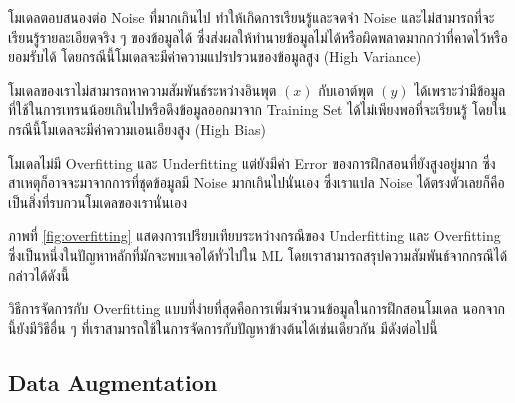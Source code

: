 \begin{description}[style=nextline]
    \item[Overfitting] โมเดลตอบสนองต่อ Noise ที่มากเกินไป ทำให้เกิดการเรียนรู้และจดจำ Noise และไม่สามารถที่จะเรียนรู้รายละเอียดจริง ๆ ของข้อมูลได้ ซึ่งส่งผลให้ทำนายข้อมูลไม่ได้หรือผิดพลาดมากกว่าที่คาดไว้หรือยอมรับได้ โดยกรณีนี้โมเดลจะมีค่าความแปรปรวนของข้อมูลสูง 
    (High Variance)
    
    \item[Underfitting] โมเดลของเราไม่สามารถหาความสัมพันธ์ระหว่างอินพุต $(x)$ กับเอาต์พุต $(y)$ ได้เพราะว่ามีข้อมูลที่ใช้ในการเทรนน้อยเกินไปหรือดึงข้อมูลออกมาจาก Training Set ได้ไม่เพียงพอที่จะเรียนรู้ โดยในกรณีนี้โมเดลจะมีค่าความเอนเอียงสูง (High Bias)

    \item[Noisy] โมเดลไม่มี Overfitting และ Underfitting แต่ยังมีค่า Error ของการฝึกสอนที่ยังสูงอยู่มาก ซึ่งสาเหตุก็อาจจะมาจากการที่ชุดข้อมูลมี Noise มากเกินไปนั่นเอง ซึ่งเราแปล Noise ได้ตรงตัวเลยก็คือเป็นสิ่งที่รบกวนโมเดลของเรานั่นเอง
\end{description}

ภาพที่ \ref{fig:overfitting} แสดงการเปรียบเทียบระหว่างกรณีของ Underfitting และ Overfitting ซึ่งเป็นหนึ่งในปัญหาหลักที่มักจะพบเจอได้ทั่วไปใน ML โดยเราสามารถสรุปความสัมพันธ์จากกรณีได้กล่าวได้ดังนี้


วิธีการจัดการกับ Overfitting แบบที่ง่ายที่สุดคือการเพิ่มจำนวนข้อมูลในการฝึกสอนโมเดล นอกจากนี้ยังมีวิธีอื่น ๆ ที่เราสามารถใช้ในการจัดการกับปัญหาข้างต้นได้เช่นเดียวกัน มีดังต่อไปนี้

\subsection{Data Augmentation}
\label{ssec:data_aug}

